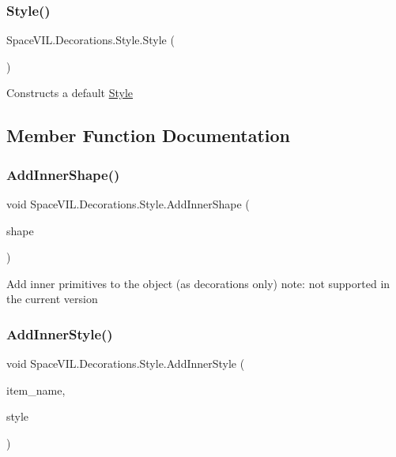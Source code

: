\subsubsection{\texorpdfstring{Style()}{Style()}}
{\footnotesize\ttfamily Space\+V\+I\+L.\+Decorations.\+Style.\+Style (\begin{DoxyParamCaption}{ }\end{DoxyParamCaption})}



Constructs a default \mbox{\hyperlink{class_space_v_i_l_1_1_decorations_1_1_style}{Style}} 



\subsection{Member Function Documentation}
\mbox{\label{class_space_v_i_l_1_1_decorations_1_1_style_ae4e785fa8ccbd1344118f85bd9876f76}} 
\subsubsection{\texorpdfstring{Add\+Inner\+Shape()}{AddInnerShape()}}
{\footnotesize\ttfamily void Space\+V\+I\+L.\+Decorations.\+Style.\+Add\+Inner\+Shape (\begin{DoxyParamCaption}\item[{\mbox{\hyperlink{interface_space_v_i_l_1_1_core_1_1_i_base_item}{I\+Base\+Item}}}]{shape }\end{DoxyParamCaption})}



Add inner primitives to the object (as decorations only) note\+: not supported in the current version 

\mbox{\label{class_space_v_i_l_1_1_decorations_1_1_style_a8a6ad9d73ab3298887c280327acca616}} 
\subsubsection{\texorpdfstring{Add\+Inner\+Style()}{AddInnerStyle()}}
{\footnotesize\ttfamily void Space\+V\+I\+L.\+Decorations.\+Style.\+Add\+Inner\+Style (\begin{DoxyParamCaption}\item[{String}]{item\+\_\+name,  }\item[{\mbox{\hyperlink{class_space_v_i_l_1_1_decorations_1_1_style}{Style}}}]{style }\end{DoxyParamCaption})}



